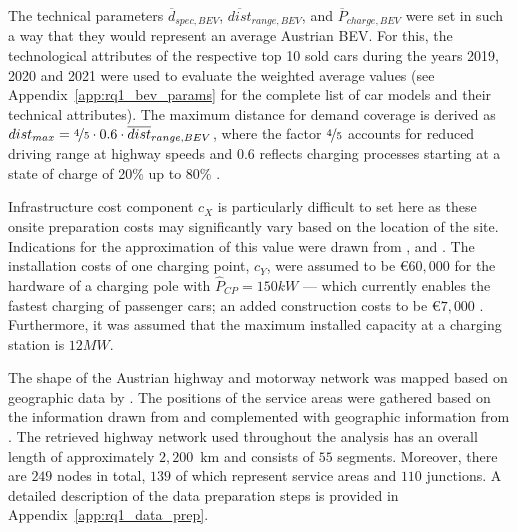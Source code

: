   The technical parameters $\overline{d}_{spec, BEV}$, $\overline{dist}_{range, BEV}$, and $\overline{P}_{charge, BEV}$ were set in such a way that they would represent an average Austrian \ac{BEV}. For this, the technological attributes of the respective top 10 sold cars during the years 2019, 2020 and 2021 were used to evaluate the weighted average values (see Appendix~\ref{app:rq1_bev_params} for the complete list of car models and their technical attributes). The maximum distance for demand coverage is derived as $dist_{max}=\nicefrac{4}{5} \cdot 0.6 \cdot \overline{dist}_{range, BEV}$, where the factor $\nicefrac{4}{5}$ accounts for reduced driving range at highway speeds \citep{Baresch2019, Napoli2020} and $0.6$ reflects charging processes starting at a state of charge of 20\% up to 80\% \citep{NEUBAUER201412}.

    Infrastructure cost component $c_X$ is particularly difficult to set here as these onsite preparation costs may significantly vary based on the location of the site.
    Indications for the approximation of this value were drawn from \cite{Jochem2016}, \cite{Serradilla2017} and \cite{Verein2019}. The installation costs of one charging point, $c_Y$, were assumed to be \euro$60,000$ for the hardware of a charging pole with $\hat{P}_{CP} = 150kW$ --- which currently enables the fastest charging of passenger cars; an added construction costs to be \euro$7,000$ \citep{Verein2019, Suarez2019}. Furthermore, it was assumed that the maximum installed capacity at a charging station is $12 MW$.
    
       The shape of the Austrian highway and motorway network was mapped based on geographic data by \citet{OpenStreetMap}. The positions of the service areas were gathered based on the information drawn from \citet{ASFINAG_Rastanlagensuche} and complemented with geographic information from \citet{OpenStreetMap}. The retrieved highway network used throughout the analysis has an overall length of approximately $2{,}200$~km and consists of $55$ segments. Moreover, there are $249$ nodes in total, $139$ of which represent service areas and $110$ junctions. A detailed description of the data preparation steps is provided in Appendix~\ref{app:rq1_data_prep}.
    
    

        
    
